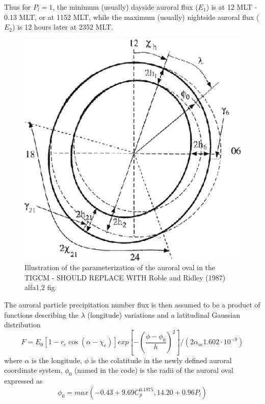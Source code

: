 %   
Thus for $P_l = 1$, the minimum (usually) dayside auroral flux ($E_1$) is at 12 MLT - 0.13 MLT,
or at 1152 MLT, while the maximum (usually) nightside auroral flux ($E_2$) is 12 hours later
at 2352 MLT. \\
%
\begin{figure}
  \centering
  \includegraphics[scale=1.0, angle=0]{./tex_plot/fig3_wenbin.eps}
  \caption{ Illustration of the parameterization of the auroral oval
    in the TIGCM - SHOULD REPLACE WITH Roble and Ridley (1987) alfa1,2 fig.}
   \label{fig:aurora_1}
\end{figure}
%
The auroral particle precipitation number flux is then assumed 
to be a product of functions describing the $\lambda$ (longitude) variations 
and a latitudinal Gaussian distribution \cite{roble1987}
%
\begin{equation}
   F = E_0 [1-r_e \cos(\alpha - \chi_e)]exp[-(\frac{\phi-\phi_0}{h})^2]/ 
      (2\alpha_m 1.602 \cdot 10^{-9})
    \label{eq:aurora_5}
\end{equation}
%   
where $\alpha$ is the longitude, $\phi$ is the colatitude in 
the newly defined auroral coordinate system, $\phi_0$ (named  
in the code) is the radii of the auroral oval expressed as
%
\begin{equation}
   \phi_0 = max(-0.43 + 9.69 C_p^0.1875, 14.20 + 0.96 P_l)
    \label{eq:aurora_6}
\end{equation}
